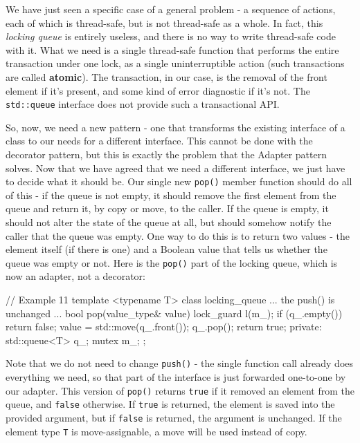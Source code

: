 We have just seen a specific case of a general problem - a sequence of actions, each of which is thread-safe, but is not thread-safe as a whole. In fact, this \emph{locking queue} is entirely useless, and there is no way to write thread-safe code with it. What we need is a single thread-safe function that performs the entire transaction under one lock, as a single uninterruptible action (such transactions are called \textbf{atomic}). The transaction, in our case, is the removal of the front element if it's present, and some kind of error diagnostic if it's not. The \texttt{std::queue} interface does not provide such a transactional API.

So, now, we need a new pattern - one that transforms the existing interface of a class to our needs for a different interface. This cannot be done with the decorator pattern, but this is exactly the problem that the Adapter pattern solves. Now that we have agreed that we need a different interface, we just have to decide what it should be. Our single new \texttt{pop()} member function should do all of this - if the queue is not empty, it should remove the first element from the queue and return it, by copy or move, to the caller. If the queue is empty, it should not alter the state of the queue at all, but should somehow notify the caller that the queue was empty. One way to do this is to return two values - the element itself (if there is one) and a Boolean value that tells us whether the queue was empty or not. Here is the \texttt{pop()} part of the locking queue, which is now an adapter, not a decorator:

\begin{code}
// Example 11
template <typename T> class locking_queue {
  ... the push() is unchanged ...
  bool pop(value_type& value) {
    lock_guard l(m_);
    if (q_.empty()) return false;
    value = std::move(q_.front());
    q_.pop();
    return true;
  }
  private:
  std::queue<T> q_;
  mutex m_;
};
\end{code}

Note that we do not need to change \texttt{push()} - the single function call already does everything we need, so that part of the interface is just forwarded one-to-one by our adapter. This version of \texttt{pop()} returns \texttt{true} if it removed an element from the queue, and \texttt{false} otherwise. If \texttt{true} is returned, the element is saved into the provided argument, but if \texttt{false} is returned, the argument is unchanged. If the element type \texttt{T} is move-assignable, a move will be used instead of copy.

